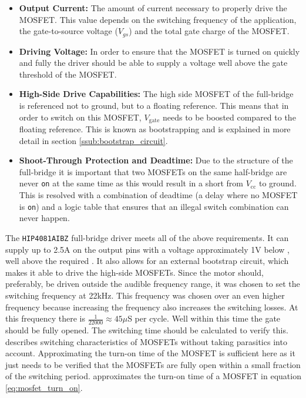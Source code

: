 \begin{itemize}
	\item \textbf{Output Current:} The amount of current necessary to properly drive the MOSFET.
	This value depends on the switching frequency of the application, the gate-to-source voltage ($V_{gs}$) and the total gate charge of the MOSFET.
	\item \textbf{Driving Voltage:} In order to ensure that the MOSFET is turned on quickly and fully the driver should be able to supply a voltage well above the gate threshold of the MOSFET.
	\item \textbf{High-Side Drive Capabilities:} The high side MOSFET of the full-bridge is referenced not to ground, but to a floating reference.
	This means that in order to switch on this MOSFET, $V_{\text{gate}}$ needs to be boosted compared to the floating reference. 
	This is known as bootstrapping and is explained in more detail in section \ref{ssub:bootstrap_circuit}.
	\item \textbf{Shoot-Through Protection and Deadtime:} Due to the structure of the full-bridge it is important that two MOSFETs on the same half-bridge are never \texttt{on} at the same time as this would result in a short from $V_{\text{cc}}$ to ground.
	This is resolved with a combination of deadtime (a delay where no MOSFET is \texttt{on}) and a logic table that ensures that an illegal switch combination can never happen.
\end{itemize}

The \texttt{HIP4081AIBZ} \cite{driver} full-bridge driver meets all of the above requirements.
It can supply up to 2.5A on the output pins with a voltage approximately 1V below \vcc, well above the required \vth.
It also allows for an external bootstrap circuit, which makes it able to drive the high-side MOSFETs.
Since the motor should, preferably, be driven outside the audible frequency range, it was chosen to set the switching frequency at 22kHz.
This frequency was chosen over an even higher frequency because increasing the frequency also increases the switching losses.
At this frequency there is $\frac{1}{22000}\approx45\mu$S per cycle. 
Well within this time the gate should be fully opened.
The switching time should be calculated to verify this.
\cite{mosfet_switch_app_note} describes switching characteristics of MOSFETs without taking parasitics into account.
Approximating the turn-on time of the MOSFET is sufficient here as it just needs to be verified that the MOSFETs are fully open within a small fraction of the switching period.
\cite{mosfet_switch_app_note} approximates the turn-on time of a MOSFET in equation \ref{eq:mosfet_turn_on}.

